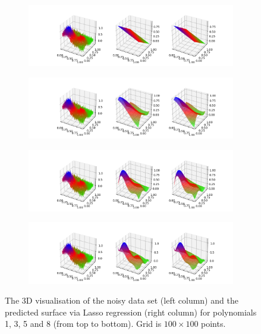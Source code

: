 \begin{figure}[!ht]
\begin{subfigure}{\textwidth}
  \centering
  \includegraphics[width=1\linewidth]{images/surf/fake_linear_p01_n100.png}
\end{subfigure}
\begin{subfigure}{\textwidth}
  \centering
  \includegraphics[width=1\linewidth]{images/surf/fake_linear_p03_n100.png}
\end{subfigure}
\begin{subfigure}{\textwidth}
  \centering
  \includegraphics[width=1\linewidth]{images/surf/fake_linear_p05_n100.png}
\end{subfigure}
\begin{subfigure}{\textwidth}
  \centering
  \includegraphics[width=1\linewidth]{images/surf/fake_linear_p08_n100.png}
\end{subfigure}
\caption{The 3D visualisation of the noisy data set (left column) and the predicted surface via Lasso regression (right column) for polynomials 1, 3, 5 and 8 (from top to bottom). Grid is $100\times100$ points.}
\label{fig:linear-surf2}
\end{figure}
 
